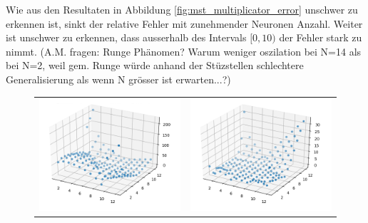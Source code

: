 Wie aus den Resultaten in Abbildung \ref{fig:mst_multiplicator_error} unschwer zu erkennen ist, sinkt der relative Fehler mit zunehmender Neuronen Anzahl. Weiter ist unschwer zu erkennen, dass ausserhalb des Intervals $[0, 10)$ der Fehler stark zu nimmt. (A.M. fragen: Runge Phänomen? Warum weniger oszilation bei N=14 als bei N=2, weil gem. Runge würde anhand der Stüzstellen schlechtere Generalisierung als wenn N grösser ist erwarten...?)
\begin{figure}
	\centering
	\begin{tabular}{cc}
		\includegraphics[scale=0.4]{learning/img/abs_plot_2_clean.png} &
		\includegraphics[scale=0.4]{learning/img/abs_plot_6_clean.png} \\

\end{tabular}
\end{figure}

